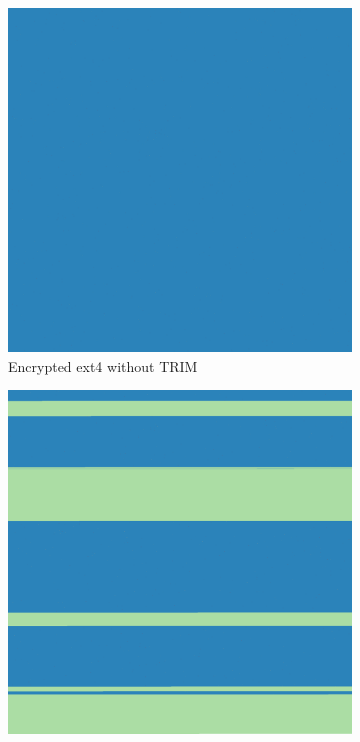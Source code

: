 \documentclass[
  digital, %
  color,   %
  oneside, %
  lof,     %
  nolot,     %
]{fithesis4}
\begin{document}
\begin{figure}
  \centering
  \begin{subfigure}[t]{0.45\textwidth}
    \centering
    \includegraphics[width=\textwidth,interpolate=false]{test-ext4-no-trim-chi2-4-sweeping.png}
    \caption{Encrypted ext4 without TRIM}
    \label{fig:trim-ext4-no-trim}
  \end{subfigure}
  \hfill
  \begin{subfigure}[t]{0.45\textwidth}
    \centering
    \includegraphics[width=\textwidth,interpolate=false]{test-ext4-chi2-4-sweeping.png}

\end{subfigure}
\end{figure}
\end{document}
